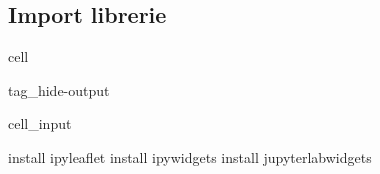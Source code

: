 \documentclass[letterpaper,10pt,italian]{jupyterBook}
\begin{document}
\subsection{Import librerie}
\label{\detokenize{ch/history-test:import-librerie}}
\begin{sphinxuseclass}{cell}
\begin{sphinxuseclass}{tag_hide-output}\begin{sphinxVerbatimInput}

\begin{sphinxuseclass}{cell_input}
\begin{sphinxVerbatim}[commandchars=\\\{\}]
 install ipyleaflet
 install ipywidgets
 install jupyterlab\PYGZus{}widgets

\end{sphinxVerbatim}

\end{sphinxuseclass}\end{sphinxVerbatimInput}

\end{sphinxuseclass}
\end{sphinxuseclass}
\end{document}
